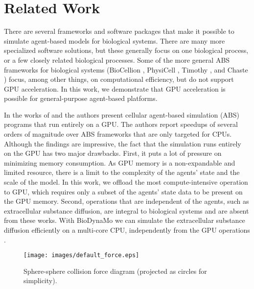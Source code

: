 \documentclass[conference]{IEEEtran}
\begin{document}
\section{Related Work}\label{sec:related_work}
\par There are several frameworks and software packages that make it possible to simulate agent-based models for biological systems.
There are many more specialized software solutions, but these generally focus on one biological process, or a few closely related biological processes.
Some of the more general ABS frameworks for biological systems (BioCellion \cite{kang2014biocellion}, PhysiCell \cite{ghaffarizadeh2018physicell}, Timothy \cite{cytowski2014large}, and Chaste \cite{mirams2013chaste}) 
focus, among other things, on computational efficiency, but do not support GPU acceleration. 
In this work, we demonstrate that GPU acceleration is possible for general-purpose agent-based platforms.
\par In the works of \cite{lysenko2008} and \cite{richmond_high_2010} the authors present cellular agent-based simulation (ABS) programs that run entirely on a GPU.
The authors report speedups of several orders of magnitude over ABS frameworks that are only targeted for CPUs.
Although the findings are impressive, the fact that the simulation runs entirely on the GPU has two major drawbacks.
First, it puts a lot of pressure on minimizing memory consumption.
As GPU memory is a non-expandable and limited resource, there is a limit to the complexity of the agents' state and the scale of the model.
In this work, we offload the most compute-intensive operation to GPU, which requires only a subset of the agents' state data to be present on the GPU memory.
Second, operations that are independent of the agents, such as extracellular substance diffusion, are integral to biological systems and are absent from these works.
With BioDynaMo we can simulate the extracellular substance diffusion efficiently on a multi-core CPU, independently from the GPU operations \cite{breitwieser2021biodynamo}.

\begin{figure}[t]
    \centering
    \texttt{[image: images/default\_force.eps]}
    \caption{Sphere-sphere collision force diagram (projected as circles for simplicity).}
    \label{fig:default_force}
\end{figure}
\end{document}
